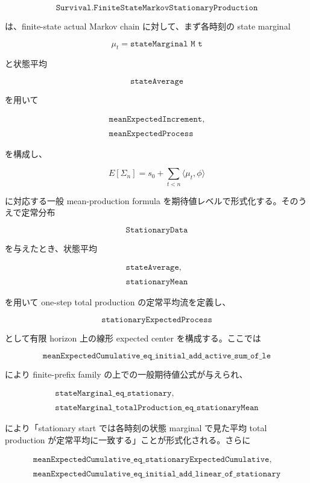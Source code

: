 \documentclass[12pt,a4paper]{article}
\begin{document}
\[
\texttt{Survival.FiniteStateMarkovStationaryProduction}
\]

は、finite-state actual Markov chain に対して、まず各時刻の state marginal

\[
\mu_{t} = \texttt{stateMarginal M t}
\]

と状態平均

\[
\texttt{stateAverage}
\]

を用いて

\[
\begin{aligned}
\texttt{meanExpectedIncrement}, \\
\qquad \\
\texttt{meanExpectedProcess}
\end{aligned}
\]

を構成し、

\[
E[\Sigma_{n}] = s_0 + \sum_{t<n}\langle \mu_{t},\phi\rangle
\]

に対応する一般 mean-production formula を期待値レベルで形式化する。そのうえで定常分布

\[
\texttt{StationaryData}
\]

を与えたとき、状態平均

\[
\begin{aligned}
\texttt{stateAverage}, \\
\qquad \\
\texttt{stationaryMean}
\end{aligned}
\]

を用いて one-step total production の定常平均流を定義し、

\[
\texttt{stationaryExpectedProcess}
\]

として有限 horizon 上の線形 expected center を構成する。ここでは

\[
\texttt{meanExpectedCumulative\_eq\_initial\_add\_active\_sum\_of\_le}
\]

により finite-prefix family の上での一般期待値公式が与えられ、

\[
\begin{aligned}
\texttt{stateMarginal\_eq\_stationary}, \\
\qquad \\
\texttt{stateMarginal\_totalProduction\_eq\_stationaryMean}
\end{aligned}
\]

により「stationary start では各時刻の状態 marginal で見た平均 total production が定常平均に一致する」ことが形式化される。さらに

\[
\begin{aligned}
\texttt{meanExpectedCumulative\_eq\_stationaryExpectedCumulative}, \\
\qquad \\
\texttt{meanExpectedCumulative\_eq\_initial\_add\_linear\_of\_stationary}
\end{aligned}
\]
\end{document}
